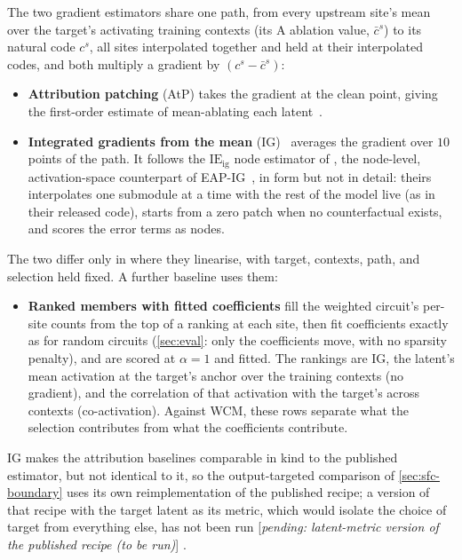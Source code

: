 \documentclass[10pt]{article}
\newif\ifexternal
\DeclareRobustCommand{\pending}[1]{%
  \ifexternal
    \ifvmode\textcolor{black!55}{[to be added]}\else\unskip\fi
  \else
    \textcolor{red!70!black}{[\textit{pending: #1}]}%
  \fi}
\begin{document}
The two gradient estimators share one path, from every upstream site's mean over the target's activating training contexts (its A ablation value, $\bar{c}^{s}$) to its natural code $c^{s}$, all sites interpolated together and held at their interpolated codes, and both multiply a gradient by $(c^{s} - \bar{c}^{s})$:
\begin{itemize}
\item \textbf{Attribution patching} (AtP) takes the gradient at the clean point, giving the first-order estimate of mean-ablating each latent~\citep{nanda2023attribution, syed2023attribution, kramar2024atp}.
\item \textbf{Integrated gradients from the mean} (IG)~\citep{sundararajan2017axiomatic} averages the gradient over $10$ points of the path. It follows the $\mathrm{IE}_{\mathrm{ig}}$ node estimator of \citet{marks2025sparse}, the node-level, activation-space counterpart of EAP-IG~\citep{hanna2024faith}, in form but not in detail: theirs interpolates one submodule at a time with the rest of the model live (as in their released code), starts from a zero patch when no counterfactual exists, and scores the error terms as nodes.
\end{itemize}
The two differ only in where they linearise, with target, contexts, path, and selection held fixed.
A further baseline uses them:
\begin{itemize}
\item \textbf{Ranked members with fitted coefficients} fill the weighted circuit's per-site counts from the top of a ranking at each site, then fit coefficients exactly as for random circuits (\cref{sec:eval}: only the coefficients move, with no sparsity penalty), and are scored at $\alpha = 1$ and fitted. The rankings are IG, the latent's mean activation at the target's anchor over the training contexts (no gradient), and the correlation of that activation with the target's across contexts (co-activation). Against WCM, these rows separate what the selection contributes from what the coefficients contribute.
\end{itemize}
IG makes the attribution baselines comparable in kind to the published estimator, but not identical to it, so the output-targeted comparison of \cref{sec:sfc-boundary} uses its own reimplementation of the published recipe; a version of that recipe with the target latent as its metric, which would isolate the choice of target from everything else, has not been run \pending{latent-metric version of the published recipe (to be run)}.
\end{document}
